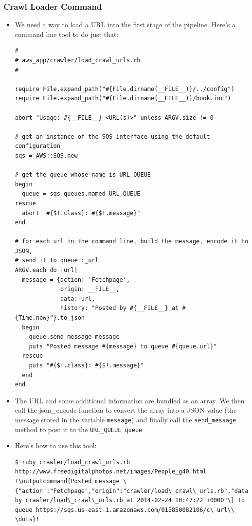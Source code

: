 \documentclass{beamer}
\newcommand{\outputcommand}[1]{\color{darkgreen}{#1|}}
\begin{document}
\begin{frame}
\frametitle{Crawl Loader Command}

\begin{itemize}
\item We need a way to load a URL into the first stage of the pipeline. Here’s a command
line tool to do just that:
\lstset{language=Ruby, style=eclipse}
\begin{lstlisting}
#
# aws_app/crawler/load_crawl_urls.rb
#

require File.expand_path("#{File.dirname(__FILE__)}/../config")
require File.expand_path("#{File.dirname(__FILE__)}/book.inc")

abort "Usage: #{__FILE__} <URL(s)>" unless ARGV.size != 0

# get an instance of the SQS interface using the default configuration
sqs = AWS::SQS.new

# get the queue whose name is URL_QUEUE
begin
  queue = sqs.queues.named URL_QUEUE
rescue
  abort "#{$!.class}: #{$!.message}"
end

# for each url in the command line, build the message, encode it to JSON,
# send it to queue c_url
ARGV.each do |url|
  message = {action: 'Fetchpage',
             origin: __FILE__,
             data: url,
             history: "Posted by #{__FILE__} at #{Time.now}"}.to_json
  begin
    queue.send_message message
    puts "Posted message #{message} to queue #{queue.url}"
  rescue
    puts "#{$!.class}: #{$!.message}"
  end
end
\end{lstlisting}


\item The URL and some additional information are bundled as an array. We then call
the json\_encode function to convert the array into a JSON value (the message
stored in the variable \texttt{message}) and finally call the \texttt{send\_message} method to post it to the
\texttt{URL\_QUEUE queue}

\item Here’s how to use this tool:
\lstset{language=shell}
\begin{lstlisting}[escapechar=!]
$ ruby crawler/load_crawl_urls.rb http://www.freedigitalphotos.net/images/People_g40.html
!\outputcommand{Posted message \{"action":"Fetchpage","origin":"crawler/load\_crawl\_urls.rb","data":"http://www.freedigitalphotos.net/images/People\_g40.html","history":"Posted by crawler/load\_crawl\_urls.rb at 2014-02-24 10:47:22 +0000"\} to queue https://sqs.us-east-1.amazonaws.com/015850082106/c\_url\\
\dots}!
\end{lstlisting}

\end{itemize}


\end{frame}
\end{document}
